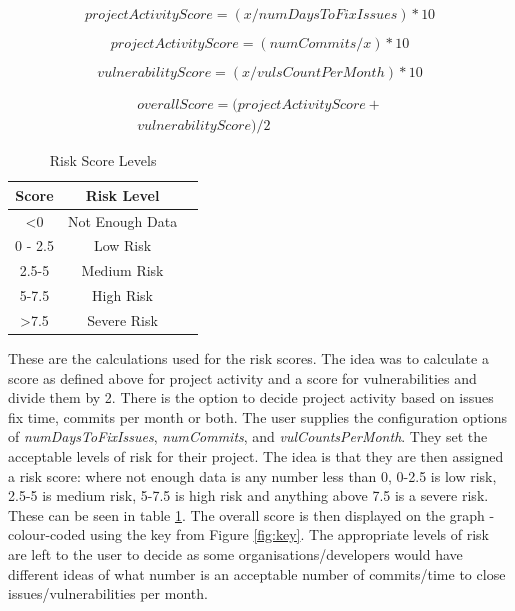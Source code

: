 \documentclass[conference]{IEEEtran}
\begin{document}
{\[ projectActivityScore = ( x / numDaysToFixIssues ) * 10\]

\[ projectActivityScore = ( numCommits / x ) * 10\]

\[vulnerabilityScore = ( x / vulsCountPerMonth ) * 10\]

\begin{multline*}
  overallScore = ( projectActivityScore +\\ vulnerabilityScore) / 2 
\end{multline*}

\begin{table}
 \caption{Risk Score Levels}
\label{risklevels}
\begin{center}
\begin{tabular}{|c|c|c|}
\hline
    \textbf{Score} & \textbf{Risk Level} \\ \hline
    \textless  0 & Not Enough Data \\ \hline
    0 - 2.5 & Low Risk \\ \hline
    2.5-5 & Medium Risk \\ \hline
    5-7.5 & High Risk \\ \hline
    \textgreater 7.5  & Severe Risk \\ \hline
\end{tabular}
\end{center}
\end{table}

These are the calculations used for the risk scores. The idea was to calculate a score as defined above for project activity and a score for vulnerabilities and divide them by 2. There is the option to decide project activity based on issues fix time, commits per month or both. The user supplies the configuration options of \textit{numDaysToFixIssues}, \textit{numCommits}, and \textit{vulCountsPerMonth}. They set the acceptable levels of risk for their project. The idea is that they are then assigned a risk score: where not enough data is any number less than 0, 0-2.5 is low risk, 2.5-5 is medium risk, 5-7.5 is high risk and anything above 7.5 is a severe risk. These can be seen in table \ref{risklevels}. The overall score is then displayed on the graph - colour-coded using the key from Figure \ref{fig:key}. The appropriate levels of risk are left to the user to decide as some organisations/developers would have different ideas of what number is an acceptable number of commits/time to close issues/vulnerabilities per month. 

}
\end{document}
